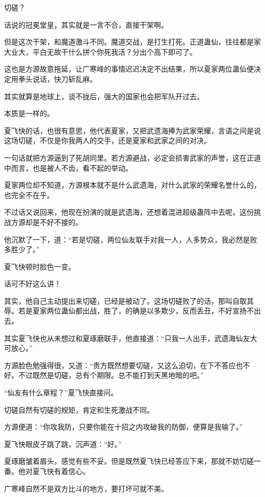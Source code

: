 
\begin{this_body}

切磋？

话说的冠冕堂皇，其实就是一言不合，直接干架啊。

但是这次干架，和魔道激斗不同。魔道交战，是打生打死。正道蛊仙，往往都是家大业大，平白无故干什么拼个你死我活？分出个高下即可了。

这也是方源故意拖延，让广寒峰的事情迟迟决定不出结果，所以夏家两位蛊仙便决定用拳头说话，快刀斩乱麻。

其实就算是地球上，谈不拢后，强大的国家也会把军队开过去。

本质是一样的。

夏飞快的话，也很有意思，他代表夏家，又把武遗海捧为武家荣耀，言语之间是说这场切磋，不仅是你我两人的交手，还是夏家和武家之间的对决。

一句话就把方源逼到了死胡同里。若方源避战，必定会损害武家的声誉，这在正道中而言，也是被人不齿，看不起的举动。

夏家两位却不知道，方源根本就不是什么武遗海，对什么武家的荣耀名誉什么的，也完全不在乎。

不过话又说回来，他现在扮演的就是武遗海，还想着混进超级蛊阵中去呢，这份挑战方源却是不好不接的。

他沉默了一下，道：“若是切磋，两位仙友联手对我一人，人多势众，我必然是败多胜少了。”

夏飞快顿时脸色一变。

话可不好这么讲！

其实，他自己主动提出来切磋，已经是被动了。这场切磋败了的话，那叫自取其辱。若是夏家两位蛊仙都出战，胜了，的确是以多欺少，反而丢丑，不好宣扬不出去。

其实夏飞快也从未想过和夏琢磨联手，他直接道：“只我一人出手，武遗海仙友大可放心。”

方源脸色勉强得很，又道：“贵方既然想要切磋，又这么迫切，在下不答应也不好。不过既然是切磋，总有个期限。总不能打到天黑地暗的吧。”

“仙友有什么章程？”夏飞快直接问。

切磋自然有切磋的规矩，肯定和生死激战不同。

方源便道：“你攻我防，只要你能在十招之内攻破我的防御，便算是我输了。”

夏飞快眼皮子跳了跳，沉声道：“好。”

夏琢磨皱着眉头，感觉有些不妥。但是既然夏飞快已经答应下来，那就不妨切磋一番。他对夏飞快有着信心。

广寒峰自然不是双方比斗的地方，要打坏可就不美。


\end{this_body}
